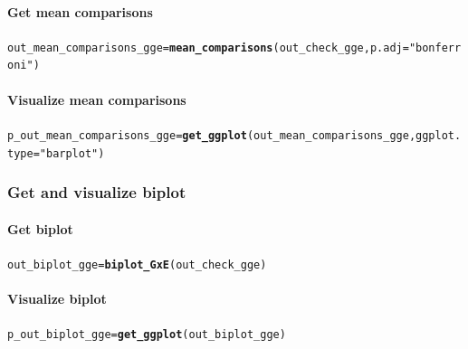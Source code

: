 \documentclass{article}\usepackage[]{graphicx}\usepackage[]{color}
\makeatletter
\newcommand{\hlstr}[1]{\textcolor[rgb]{0.192,0.494,0.8}{#1}}%
\newcommand{\hlstd}[1]{\textcolor[rgb]{0.345,0.345,0.345}{#1}}%
\newcommand{\hlkwb}[1]{\textcolor[rgb]{0.69,0.353,0.396}{#1}}%
\newcommand{\hlkwc}[1]{\textcolor[rgb]{0.333,0.667,0.333}{#1}}%
\newcommand{\hlkwd}[1]{\textcolor[rgb]{0.737,0.353,0.396}{\textbf{#1}}}%
\newenvironment{kframe}{%
 \def\at@end@of@kframe{}%
 \ifinner\ifhmode%
  \def\at@end@of@kframe{\end{minipage}}%
  \begin{minipage}{\columnwidth}%
 \fi\fi%
 \def\FrameCommand##1{\hskip\@totalleftmargin \hskip-\fboxsep
 \colorbox{shadecolor}{##1}\hskip-\fboxsep
     \hskip-\linewidth \hskip-\@totalleftmargin \hskip\columnwidth}%
 \MakeFramed {\advance\hsize-\width
   \@totalleftmargin\z@ \linewidth\hsize
   \@setminipage}}%
 {\par\unskip\endMakeFramed%
 \at@end@of@kframe}
\newenvironment{knitrout}{}{} %
\makeatother
\begin{document}
\paragraph{Get mean comparisons}
\begin{knitrout}
\color{fgcolor}\begin{kframe}
\begin{alltt}
\hlstd{out_mean_comparisons_gge} \hlkwb{=} \hlkwd{mean_comparisons}\hlstd{(out_check_gge,} \hlkwc{p.adj} \hlstd{=} \hlstr{"bonferroni"}\hlstd{)}
\end{alltt}
\end{kframe}
\end{knitrout}

\paragraph{Visualize mean comparisons}
\begin{knitrout}
\color{fgcolor}\begin{kframe}
\begin{alltt}
\hlstd{p_out_mean_comparisons_gge} \hlkwb{=} \hlkwd{get_ggplot}\hlstd{(out_mean_comparisons_gge,} \hlkwc{ggplot.type} \hlstd{=} \hlstr{"barplot"}\hlstd{)}
\end{alltt}
\end{kframe}
\end{knitrout}

\subsubsection{Get and visualize biplot}

\paragraph{Get biplot}
\begin{knitrout}
\color{fgcolor}\begin{kframe}
\begin{alltt}
\hlstd{out_biplot_gge} \hlkwb{=} \hlkwd{biplot_GxE}\hlstd{(out_check_gge)}
\end{alltt}
\end{kframe}
\end{knitrout}

\paragraph{Visualize biplot}
\begin{knitrout}
\color{fgcolor}\begin{kframe}
\begin{alltt}
\hlstd{p_out_biplot_gge} \hlkwb{=} \hlkwd{get_ggplot}\hlstd{(out_biplot_gge)}
\end{alltt}
\end{kframe}
\end{knitrout}
\end{document}
